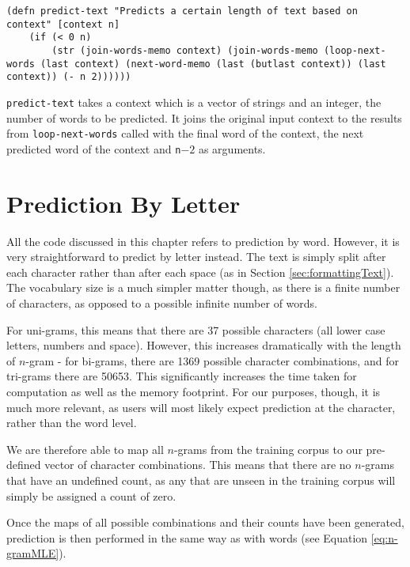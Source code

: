 \begin{lstlisting}
(defn predict-text "Predicts a certain length of text based on context" [context n] 
	(if (< 0 n) 
		(str (join-words-memo context) (join-words-memo (loop-next-words (last context) (next-word-memo (last (butlast context)) (last context)) (- n 2)))))) 
\end{lstlisting}

\lstinline!predict-text! takes a context which is a vector of strings and an integer, the number of words to be predicted. It joins the original input context to the results from \lstinline!loop-next-words! called with the final word of the context, the next predicted word of the context and \lstinline!n!$-2$ as arguments.

\section{Prediction By Letter}

All the code discussed in this chapter refers to prediction by word. However, it is very straightforward to predict by letter instead. The text is simply split after each character rather than after each space (as in Section \ref{sec:formattingText}). The vocabulary size is a much simpler matter though, as there is a finite number of characters, as opposed to a possible infinite number of words.

For uni-grams, this means that there are 37 possible characters (all lower case letters, numbers and space). However, this increases dramatically with the length of $n$-gram - for bi-grams, there are 1369 possible character combinations, and for tri-grams there are 50653. This significantly increases the time taken for computation as well as the memory footprint. For our purposes, though, it is much more relevant, as users will most likely expect prediction at the character, rather than the word level.

We are therefore able to map all $n$-grams from the training corpus to our pre-defined vector of character combinations. This means that there are no $n$-grams that have an undefined count, as any that are unseen in the training corpus will simply be assigned a count of zero.

Once the maps of all possible combinations and their counts have been generated, prediction is then performed in the same way as with words (see Equation \ref{eq:n-gramMLE}).
